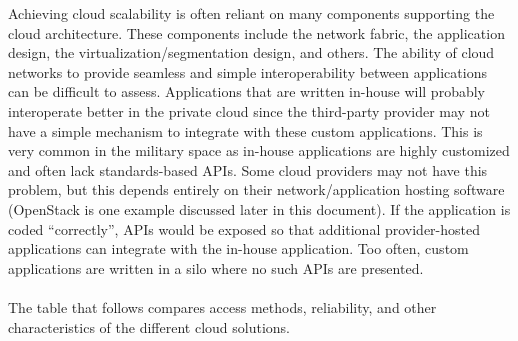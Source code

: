 Achieving cloud scalability is often reliant on many components supporting the
cloud architecture. These components include the network fabric, the
application design, the virtualization/segmentation design, and others. The
ability of cloud networks to provide seamless and simple interoperability
between applications can be difficult to assess. Applications that are written
in-house will probably interoperate better in the private cloud since the
third-party provider may not have a simple mechanism to integrate with these
custom applications. This is very common in the military space as in-house
applications are highly customized and often lack standards-based APIs. Some
cloud providers may not have this problem, but this depends entirely on their
network/application hosting software (OpenStack is one example discussed later
in this document). If the application is coded ``correctly'', APIs would be
exposed so that additional provider-hosted applications can integrate with the
in-house application. Too often, custom applications are written in a silo
where no such APIs are presented.
\\ \\
The table that follows compares access methods, reliability, and other
characteristics of the different cloud solutions.
